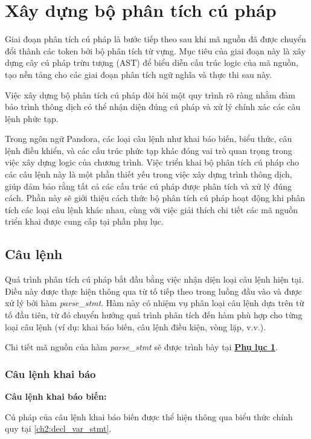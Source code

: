 \section{Xây dựng bộ phân tích cú pháp}
\label{ch3:syntax-analysis}
Giai đoạn phân tích cú pháp là bước tiếp theo sau khi mã nguồn đã được chuyển đổi thành các token bởi bộ phân tích từ vựng. Mục tiêu của giai đoạn này là xây dựng cây cú pháp trừu tượng (AST) để biểu diễn cấu trúc logic của mã nguồn, tạo nền tảng cho các giai đoạn phân tích ngữ nghĩa và thực thi sau này. 

Việc xây dựng bộ phân tích cú pháp đòi hỏi một quy trình rõ ràng nhằm đảm bảo trình thông dịch có thể nhận diện đúng cú pháp và xử lý chính xác các câu lệnh phức tạp.

Trong ngôn ngữ Pandora, các loại câu lệnh như khai báo biến, biểu thức, câu lệnh điều khiển, và các cấu trúc phức tạp khác đóng vai trò quan trọng trong việc xây dựng logic của chương trình. Việc triển khai bộ phân tích cú pháp cho các câu lệnh này là một phần thiết yếu trong việc xây dựng trình thông dịch, giúp đảm bảo rằng tất cả các cấu trúc cú pháp được phân tích và xử lý đúng cách. Phần này sẽ giới thiệu cách thức bộ phân tích cú pháp hoạt động khi phân tích các loại câu lệnh khác nhau, cùng với việc giải thích chi tiết các mã nguồn triển khai được cung cấp tại phần phụ lục.

\subsection{Câu lệnh}
Quá trình phân tích cú pháp bắt đầu bằng việc nhận diện loại câu lệnh hiện tại. Điều này được thực hiện thông qua từ tố tiếp theo trong luồng đầu vào và được xử lý bởi hàm \textit{parse\_stmt}. Hàm này có nhiệm vụ phân loại câu lệnh dựa trên từ tố đầu tiên, từ đó chuyển hướng quá trình phân tích đến hàm phù hợp cho từng loại câu lệnh (ví dụ: khai báo biến, câu lệnh điều kiện, vòng lặp, v.v.).

Chi tiết mã nguồn của hàm \textit{parse\_stmt} sẽ được trình bày tại \hyperref[ap1:stmt]{\bf Phụ lục 1}. %


\subsubsection{Câu lệnh khai báo}

\noindent\textbf{Câu lệnh khai báo biến:}

Cú pháp của câu lệnh khai báo biến được thể hiện thông qua biểu thức chính quy tại \ref{ch2:decl_var_stmt}.


